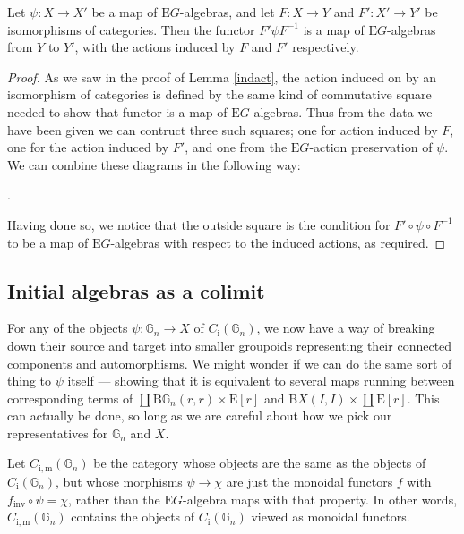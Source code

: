 \documentclass{amsart} %
\newenvironment{eq*}{\begin{equation*}}{\end{equation*}}
\begin{document}
\begin{lem}\label{indmap} Let $\psi: X \to X'$ be a map of $\mathrm{E}G$-algebras, and let $F: X \to Y$ and $F': X' \to Y'$ be isomorphisms of categories. Then the functor $F' \psi F^{-1}$ is a map of $\mathrm{E}G$-algebras from $Y$ to $Y'$,  with the actions induced by $F$ and $F'$ respectively.
\end{lem}
\begin{proof}
As we saw in the proof of Lemma \ref{indact}, the action induced on by an isomorphism of categories is defined by the same kind of commutative square needed to show that functor is a map of $\mathrm{E}G$-algebras. Thus from the data we have been given we can contruct three such squares; one for action induced by $F$, one for the action induced by $F'$, and one from the  $\mathrm{E}G$-action preservation of $\psi$. We can combine these diagrams in the following way:
\begin{eq*} .
\end{eq*}
Having done so, we notice that the outside square is the condition for $F' \circ \psi \circ F^{-1}$ to be a map of $\mathrm{E}G$-algebras with respect to the induced actions, as required.
\end{proof}

\subsection{Initial algebras as a colimit}

For any of the objects $\psi : \mathbb{G}_n \to X$ of $C_{\mathrm{i}}(\mathbb{G}_n)$, we now have a way of breaking down their source and target into smaller groupoids representing their connected components and automorphisms. We might wonder if we can do the same sort of thing to $\psi$ itself --- showing that it is equivalent to several maps running between corresponding terms of $\coprod \mathrm{B}\mathbb{G}_n(r, r) \times \mathrm{E}[r]$ and $\mathrm{B}X(I,I) \times \coprod \mathrm{E}[r]$. This can actually be done, so long as we are careful about how we pick our representatives for $\mathbb{G}_n$ and $X$.

\begin{defi} Let $C_{\mathrm{i, m}}(\mathbb{G}_n)$ be the category whose objects are the same as the objects of $C_{\mathrm{i}}(\mathbb{G}_n)$, but whose morphisms $\psi \to \chi$ are just the monoidal functors $f$ with $f_{\mathrm{inv}} \circ \psi = \chi$, rather than the $\mathrm{E}G$-algebra maps with that property. In other words, $C_{\mathrm{i, m}}(\mathbb{G}_n)$ contains the objects of $C_{\mathrm{i}}(\mathbb{G}_n)$ viewed as monoidal functors. \end{defi}
\end{document}

